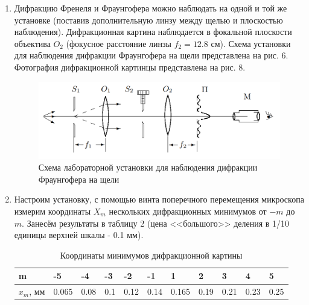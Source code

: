 \documentclass[a4paper]{article}
\begin{document}
\begin{enumerate}
    \item Дифракцию Френеля и Фраунгофера можно наблюдать на одной и той же установке (поставив дополнительную линзу между щелью и плоскостью наблюдения). Дифракционная картина наблюдается в фокальной плоскости объектива $O_2$ (фокусное расстояние линзы $f_2 = 12.8$ см). Схема установки для наблюдения дифракции Фраунгофера на щели представлена на рис. 6. Фотография дифракционной картинцы представлена на рис. 8.
    
  \begin{figure}[h]
    \centering
    \includegraphics[width=12cm]{setup_fraunhofer.PNG}
    \caption{Схема лабораторной установки для наблюдения дифракции Фраунгофера на щели}
    \label{fig:vac}
\end{figure}  
    
    \item Настроим установку, с помощью винта поперечного перемещения микроскопа измерим координаты $X_m$ нескольких дифракционных минимумов от $-m$ до $m$. Занесём результаты в таблицу 2 (цена <<большого>> деления в 1/10 единицы верхней шкалы - 0.1 мм). 
    
    \begin{table}[h]
    \centering
    \begin{center}
    \caption{Координаты минимумов дифракционной картины}
    \end{center}
    \vspace{0.1cm}
    \label{tab:my_label}
    \begin{tabular}{ |p{2.5cm}||p{0.7cm}|p{0.5cm}|p{0.5cm}|p{0.5cm}|p{0.5cm}|p{0.7cm}|p{0.5cm}|p{0.5cm}|p{0.5cm}|p{0.5cm}|}
 \hline
m & -5 & -4 & -3 & -2 & -1 & 1 & 2 & 3 & 4 & 5\\
 \hline
 $x_m$, мм & 0.065 & 0.08 & 0.1 & 0.12 & 0.14 & 0.165 & 0.19 & 0.21 & 0.23 & 0.25\\

 \hline
 
\end{tabular}
\end{table}


\end{enumerate}
\end{document}
